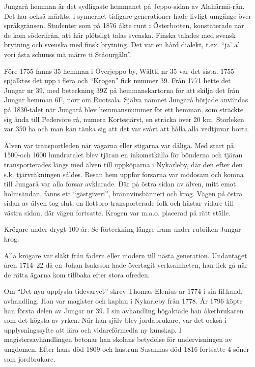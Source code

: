 %

Jungarå hemman är det sydligaste hemmanet på Jeppo-sidan av Alahärmä-rån. Det har också märkts, i synnerhet tidigare generationer hade livligt umgänge över språkgränsen. Studenter som på 1876 åkte runt i Österbotten, konstaterade när de kom söderifrån, att här plötsligt talas svenska. Finska talades med svensk brytning och svenska med finsk brytning. Det var en hård dialekt, t.ex. ``ja’ a’ vori åsta schuuss mä märre ti Ståourgåln''.

Före 1755 fanns 35 hemman i Överjeppo by, Wåltti nr 35 var det sista. 1755 spjälktes det upp i flera och ``Krogen'' fick nummer 39. Från 1771 hette det Jungar nr 39, med beteckning 39Z på hemmanskartorna för att skilja det från Jungar hemman 6F, norr om Ruotsala. Själva namnet Jungarå började användas på 1830-talet när Jungarå blev hemmansnummer för ett hemman, som sträckte sig ända till Pedersöre rå, numera Kortesjärvi, en sträcka över 20 km. Storleken var 350 ha och man kan tänka sig att det var svårt att hålla alla vedtjuvar borta.

Älven var transportleden när vägarna eller stigarna var dåliga. Med start på 1500-och 1600 hundratalet blev tjäran en inkomstkälla för bönderna och tjäran transporterades längs med älven till uppköparna i Nykarleby, där den efter den s.k. tjärvräkningen såldes. Resan hem uppför forsarna var mödosam och komna till Jungarå var alla forsar avklarade. Där på östra sidan av älven, mitt emot holmsändan, fanns ett ``gästgiveri'', brännvinsbänneri och krog. Vägen på östra sidan av älven tog slut, en flottbro transporterade folk och hästar vidare till västra sidan, där vägen fortsatte. Krogen var m.a.o. placerad på rätt ställe.

Krögare under drygt 100 år: Se förteckning längre fram under rubriken Jungar krog.

Alla krögare var släkt från fadern eller modern till nästa generation. Undantaget åren 1714--22 då en Johan Isaksson hade övertagit verksamheten, han fick gå när de rätta ägarna kom tillbaka efter stora ofreden.

Om ``Det nya upplysta tidevarvet'' skrev Thomas Elenius år 1774 i sin fil.kand.-avhandling. Han var magister och kaplan i Nykarleby från 1778. År 1796 köpte han första delen av Jungar nr 39. I sin avhandling högaktade han åkerbrukaren som det högsta av yrken. När han själv blev jordabrukare, var det också i upplysningssyfte att lära och vidareförmedla ny kunskap. I magistersavhandlingen betonar han skolans betydelse för undervisningen av ungdomen. Efter hans död 1809 och hustrun Susannas död 1816 fortsatte 4 söner som jordbrukare.


